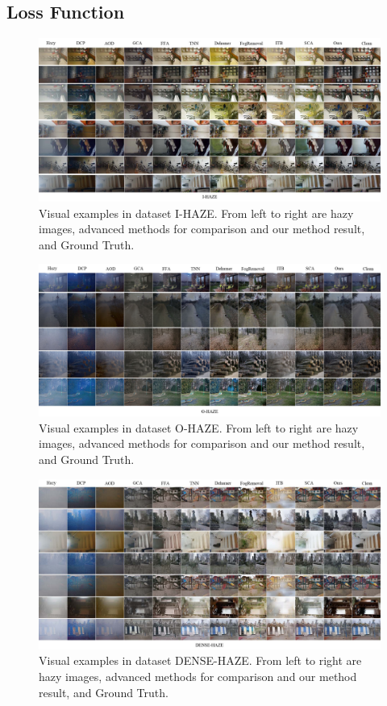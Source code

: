 \documentclass[lettersize,journal]{IEEEtran}
\begin{document}
\subsection{Loss Function}

\begin{figure}[!t]
	\centering
	\includegraphics[width=7in]{I-HAZE-compare}
	\caption{Visual examples in dataset I-HAZE. From left to right are hazy images, advanced methods for comparison and our method result, and Ground Truth.}
	\label{fig5}
\end{figure}

\begin{figure}[!t]
	\centering
	\includegraphics[width=7in]{O-HAZE-compare}
	\caption{Visual examples in dataset O-HAZE. From left to right are hazy images, advanced methods for comparison and our method result, and Ground Truth.}
	\label{fig6}
\end{figure}

\begin{figure}[!t]
	\centering
	\includegraphics[width=7in]{DENSE-HAZE-compare}
	\caption{Visual examples in dataset DENSE-HAZE. From left to right are hazy images, advanced methods for comparison and our method result, and Ground Truth.}
	\label{fig7}
\end{figure}
\end{document}
